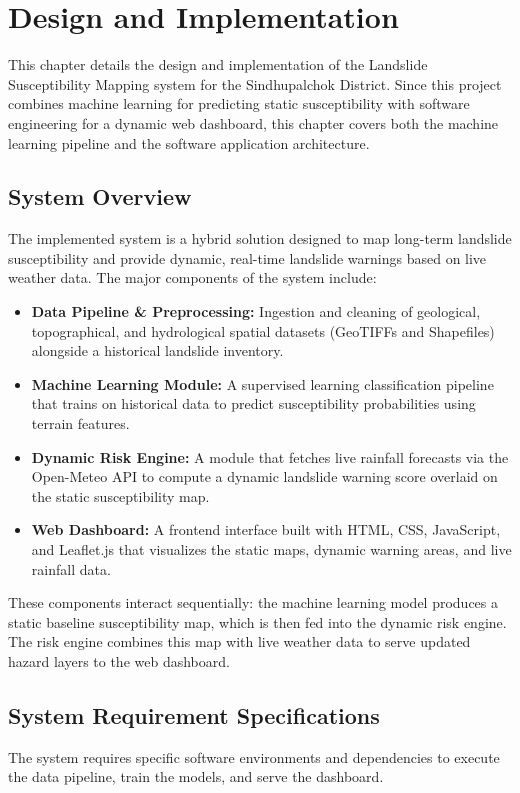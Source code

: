 \chapter{Design and Implementation}

This chapter details the design and implementation of the Landslide Susceptibility Mapping system for the Sindhupalchok District. Since this project combines machine learning for predicting static susceptibility with software engineering for a dynamic web dashboard, this chapter covers both the machine learning pipeline and the software application architecture.

\section{System Overview}
The implemented system is a hybrid solution designed to map long-term landslide susceptibility and provide dynamic, real-time landslide warnings based on live weather data. The major components of the system include:
\begin{itemize}
    \item \textbf{Data Pipeline \& Preprocessing:} Ingestion and cleaning of geological, topographical, and hydrological spatial datasets (GeoTIFFs and Shapefiles) alongside a historical landslide inventory.
    \item \textbf{Machine Learning Module:} A supervised learning classification pipeline that trains on historical data to predict susceptibility probabilities using terrain features.
    \item \textbf{Dynamic Risk Engine:} A module that fetches live rainfall forecasts via the Open-Meteo API to compute a dynamic landslide warning score overlaid on the static susceptibility map.
    \item \textbf{Web Dashboard:} A frontend interface built with HTML, CSS, JavaScript, and Leaflet.js that visualizes the static maps, dynamic warning areas, and live rainfall data.
\end{itemize}
These components interact sequentially: the machine learning model produces a static baseline susceptibility map, which is then fed into the dynamic risk engine. The risk engine combines this map with live weather data to serve updated hazard layers to the web dashboard.

\section{System Requirement Specifications}
The system requires specific software environments and dependencies to execute the data pipeline, train the models, and serve the dashboard.

